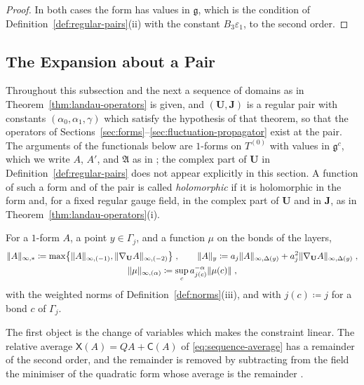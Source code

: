 \documentclass[11pt]{preprint}
\DeclarePairedDelimiter{\norm}{\lVert}{\rVert}
\numberwithin{equation}{section}
\begin{document}
\begin{proof}
In both cases the form has values in $\mathfrak g$, which is the condition of Definition~\ref{def:regular-pairs}(ii) with the constant $B_3\varepsilon_1$, to the second order.
\end{proof}

\subsection{The Expansion about a Pair}\label{sec:expansion}

Throughout this subsection and the next a sequence of domains as in Theorem~\ref{thm:landau-operators} is given, and $(\mathbf U, \mathbf J)$ is a regular pair with constants $(\alpha_0, \alpha_1, \gamma)$ which satisfy the hypothesis of that theorem, so that the operators of Sections~\ref{sec:forms}--\ref{sec:fluctuation-propagator} exist at the pair. The arguments of the functionals below are $1$-forms on $T^{(0)}$ with values in $\mathfrak g^c$, which we write $A$, $A'$, and $\mathfrak A$ as in \cite{BalabanVAR}; the complex part of $\mathbf U$ in Definition~\ref{def:regular-pairs} does not appear explicitly in this section. A function of such a form and of the pair is called \emph{holomorphic} if it is holomorphic in the form and, for a fixed regular gauge field, in the complex part of $\mathbf U$ and in $\mathbf J$, as in Theorem~\ref{thm:landau-operators}(i).

\begin{definition}\label{def:scaled-norms}
For a $1$-form $A$, a point $y \in \Gamma_j$, and a function $\mu$ on the bonds of the layers,
\begin{equation}\label{eq:scaled-norms}
\begin{gathered}
    \norm A_{\infty,*} \coloneqq \max\bigl\{ \norm A_{\infty,(-1)}, \norm{\nabla_{\mathbf U}A}_{\infty,(-2)} \bigr\}\;,
    \qquad
    \norm A_y \coloneqq a_j\norm A_{\infty,\Delta(y)} + a_j^2\norm{\nabla_{\mathbf U}A}_{\infty,\Delta(y)}\;,\\
    \norm\mu_{\infty,(\alpha)} \coloneqq \sup_ca_{j(c)}^{-\alpha}\norm{\mu(c)}\;,
\end{gathered}
\end{equation}
with the weighted norms of Definition~\ref{def:norms}(iii), and with $j(c) \coloneqq j$ for a bond $c$ of $\Gamma_j$.
\end{definition}

The first object is the change of variables which makes the constraint linear. The relative average $\mathsf X(A) = QA + \mathsf C(A)$ of \eqref{eq:sequence-average} has a remainder of the second order, and the remainder is removed by subtracting from the field the minimiser of the quadratic form whose average is the remainder \cite[Sect.~C]{BalabanVAR}.
\end{document}
